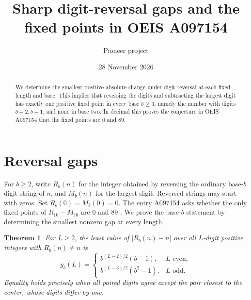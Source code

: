 \documentclass[11pt]{article}
\title{Sharp digit-reversal gaps and the fixed points in OEIS A097154}
\author{Pioneer project}
\date{28 November 2026}
\newtheorem{theorem}{Theorem}
\begin{document}
\maketitle
\begin{abstract}
We determine the smallest positive absolute change under digit reversal at each fixed length and base. This implies that reversing the digits and subtracting the largest digit has exactly one positive fixed point in every base \(b\geq 3\), namely the number with digits \(b-2,b-1\), and none in base two. In decimal this proves the conjecture in OEIS A097154 that the fixed points are \(0\) and \(89\).
\end{abstract}

\section{Reversal gaps}

For \(b\ge2\), write \(R_b(n)\) for the integer obtained by reversing the ordinary base-\(b\) digit string of \(n\), and \(M_b(n)\) for the largest digit. Reversed strings may start with zeros. Set \(R_b(0)=M_b(0)=0\). The entry A097154 asks whether the only fixed points of \(R_{10}-M_{10}\) are \(0\) and \(89\) \cite{oeis}. We prove the base-\(b\) statement by determining the smallest nonzero gap at every length.

\begin{theorem}\label{thm:gap}
For \(L\ge2\), the least value of \(\lvert R_b(n)-n\rvert\) over all \(L\)-digit positive integers with \(R_b(n)\ne n\) is
\[
g_b(L)=
\begin{cases}
 b^{(L-2)/2}(b-1), & L \text{ even},\\[2pt]
 b^{(L-3)/2}(b^2-1), & L \text{ odd}.
\end{cases}
\]
Equality holds precisely when all paired digits agree except the pair closest to the center, whose digits differ by one.
\end{theorem}
\end{document}
